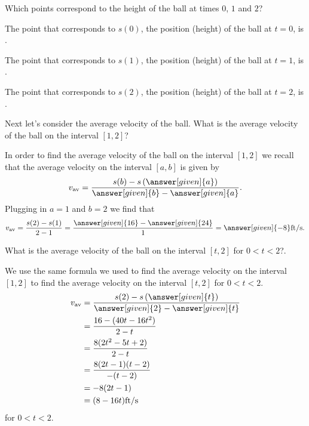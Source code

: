 \documentclass{ximera}
\begin{document}
\begin{example}
\begin{image}
\end{image}

Which points correspond to the height of the ball at times $0$, $1$ and $2$? 
\begin{explanation}
The point that corresponds to $s(0)$, the position (height) of the 
ball at $t=0$, is .

The point that corresponds to $s(1)$, the position (height) of the 
ball at $t=1$, is .

The point that corresponds to $s(2)$, the position (height) of the 
ball at $t=2$, is .

\end{explanation}

Next let's consider the average velocity of the ball. What is the average velocity of the ball on the interval $[1,2]$?

\begin{explanation}

In order to find the average velocity of the ball on the 
interval $[1,2]$ we recall that the average velocity on 
the interval $[a,b]$ is given by
\[
v_{\text{av}} = 
\frac{s(b) - s\left(\answer[given]{a}\right)}
{\answer[given]{b} - \answer[given]{a}}.
\]
Plugging in $a=1$ and $b=2$ we find that 
\[
v_{\text{av}} = \frac{s(2)-s(1)}{2-1} = 
\frac{\answer[given]{16} - \answer[given]{24}}{1} =
\answer[given]{-8}\text{ft/s.}
\] 

\end{explanation}

What is the average velocity of the ball on the interval
$[t,2]$ for $0<t<2$?.  

\begin{explanation}

We use the same formula we used to find the average velocity on
the interval $[1,2]$ to find the average velocity on the interval
$[t,2]$ for $0<t<2$.
\begin{align*}
v_{\text{av}} &= 
\frac{s(2)-s\left(\answer[given]{t}\right)}
{\answer[given]{2}-\answer[given]{t}}\\
&= \frac{16 - (40t-16t^2)}{2-t}\\
&= \frac{8(2t^2-5t+2)}{2-t}\\
&= \frac{8(2t-1)(t-2)}{-(t-2)}\\
&= -8(2t-1)\\
&= (8-16t)\text{ft/s}
\end{align*}
for $0<t<2$.


\end{explanation}
\end{example}
\end{document}

